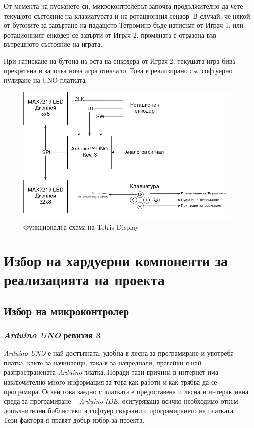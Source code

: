 \documentclass[titlepage, oneside, 14pt]{extbook}
\newcommand{\ard}{Arduino\texttrademark{}}
\begin{document}
От момента на пускането си, микроконтролерът започва продължително да чете
текущото състояние на клавиатурата и на ротационния сензор. В случай, че някой
от бутоните за завъртане на падащото Тетромино бъде натиснат от Играч 1, или
ротационният енкодер се завърти от Играч 2, промяната е отразена във вътрешното
състояние на играта.

При натискане на бутона на оста на енкодера от Играч 2, текущата игра бива прекратена и
започва нова игра отначало. Това е реализирано със софтуерно нулиране на UNO платката.

\begin{figure}[!htbp]
    \centering
    \includegraphics[width=0.5\linewidth]{img/functional_diagram.drawio.png}
    \caption{Функционална схема на Tetris Display}
\end{figure}


\section{Избор на хардуерни компоненти за реализацията на проекта}

\subsection{Избор на микроконтролер}

\subsubsection{\textit{\ard{} UNO} ревизия 3}

\textit{\ard{} UNO} \cite{arduino} е най-достъпната, удобна и лесна за програмиране и
употреба платка, както за начинаещи, така и за напреднали, правейки я
най–разпространената \textit{\ard{}} платка. Поради тази причина в интернет има
изключително много информация за това как работи и как трябва да се
програмира. Освен това заедно с платката е предоставена и лесна
и интерактивна среда за програмиране -- \textit{\ard{} IDE}, осигуряваща всичко
необходимо откъм допълнителни библиотеки и софтуер свързани с
програмирането на платката. Тези фактори я правят добър избор за
проекта.
\end{document}
